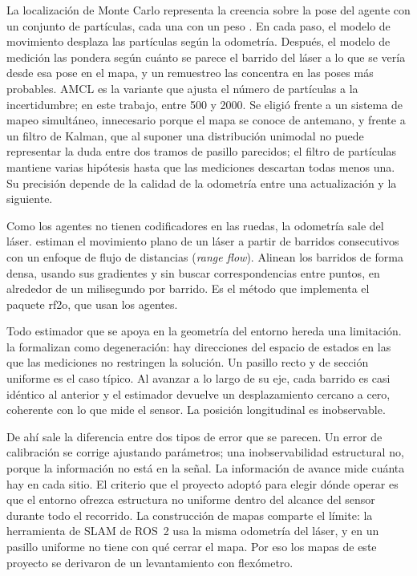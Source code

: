 La localización de Monte Carlo representa la creencia sobre la pose del agente
con un conjunto de partículas, cada una con un peso
\autocite{fox1999monte,thrun2005probabilistic}. En cada paso, el modelo de
movimiento desplaza las partículas según la odometría. Después, el modelo de
medición las pondera según cuánto se parece el barrido del láser a lo que se vería desde esa
pose en el mapa, y un remuestreo las concentra en las poses más probables. AMCL
es la variante que ajusta el número de partículas a la incertidumbre; en este
trabajo, entre 500 y 2000. Se eligió frente a
un sistema de mapeo simultáneo, innecesario porque el mapa se conoce de antemano,
y frente a un filtro de Kalman, que al suponer una distribución unimodal no puede
representar la duda entre dos tramos de pasillo parecidos; el filtro de
partículas mantiene varias hipótesis hasta que las mediciones descartan todas
menos una. Su precisión depende de la calidad de la odometría
entre una actualización y la siguiente.

Como los agentes no tienen codificadores en las ruedas, la odometría sale del
láser. \textcite{jaimez2016planar} estiman el movimiento plano de un láser a
partir de barridos consecutivos con un enfoque de flujo de distancias
(\textit{range flow}). Alinean los barridos de forma densa, usando sus
gradientes y sin buscar correspondencias entre puntos, en alrededor de un
milisegundo por barrido. Es el método que implementa el paquete rf2o, que usan
los agentes.

Todo estimador que se apoya en la geometría del entorno hereda una limitación.
\textcite{zhang2016degeneracy} la formalizan como degeneración: hay direcciones
del espacio de estados en las que las mediciones no restringen la solución. Un
pasillo recto y de sección uniforme es el caso típico. Al avanzar a lo largo de
su eje, cada barrido es casi idéntico al anterior y el estimador devuelve un
desplazamiento cercano a cero, coherente con lo que mide el sensor. La posición
longitudinal es inobservable.

De ahí sale la diferencia entre dos tipos de error que se parecen. Un error de
calibración se corrige ajustando parámetros; una inobservabilidad estructural no,
porque la información no está en la señal. La información de avance mide cuánta hay en cada sitio. El criterio que
el proyecto adoptó para elegir dónde operar es que el entorno ofrezca estructura
no uniforme dentro del alcance del sensor durante todo el recorrido. La
construcción de mapas comparte el límite: la herramienta de SLAM de ROS~2
\autocite{macenski2021slam} usa la misma odometría del láser, y en un pasillo
uniforme no tiene con qué cerrar el mapa. Por eso los mapas de este proyecto se
derivaron de un levantamiento con flexómetro.

